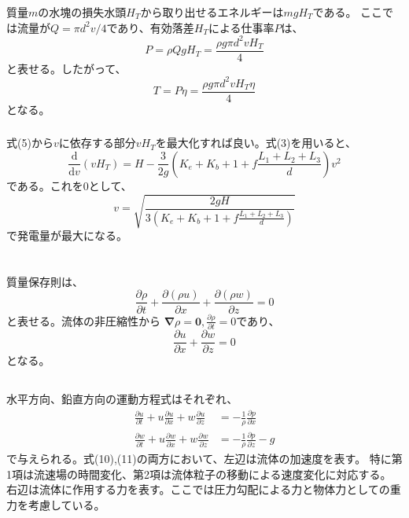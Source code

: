 \documentclass[a4paper]{jsarticle}
\begin{document}
\subsubsection{}
質量$m$の水塊の損失水頭$H_T$から取り出せるエネルギーは$mgH_T$である。
ここでは流量が$Q = \pi d^2 v / 4$であり、有効落差$H_T$による仕事率$P$は、
\begin{equation}
  P = \rho Q g H_T = \frac{\rho g \pi d^2 v H_T}{4}
\end{equation}
と表せる。したがって、
\begin{equation}
  T = P \eta = \frac{\rho g \pi d^2 v H_T \eta}{4}
\end{equation}
となる。

\subsubsection{}
式(5)から$v$に依存する部分$v H_T$を最大化すれば良い。式(3)を用いると、
\begin{equation}
  \frac{\mathrm{d}}{\mathrm{d} v}(v H_T)
  = H - \frac{3}{2g} \left(K_e + K_b + 1 + f \frac{L_1 + L_2 + L_3}{d}\right) v^2
\end{equation}
である。これを0として、
\begin{equation}
  v = \sqrt{\frac{2 g H}{3 (K_e + K_b + 1 + f \frac{L_1 + L_2 + L_3}{d})}}
\end{equation}
で発電量が最大になる。

\section{}
\subsection{}
質量保存則は、
\begin{equation}
  \frac{\partial \rho}{\partial t}
  + \frac{\partial (\rho u)}{\partial x} 
  + \frac{\partial (\rho w)}{\partial z} = 0
\end{equation}
と表せる。流体の非圧縮性から
$\boldsymbol{\nabla} \rho = \boldsymbol{0},\frac{\partial \rho}{\partial t} = 0$であり、
\begin{equation}
  \frac{\partial u}{\partial x} 
  + \frac{\partial w}{\partial z} = 0
\end{equation}
となる。

\subsection{}
水平方向、鉛直方向の運動方程式はそれぞれ、
\begin{align}
  \frac{\partial u}{\partial t} + u \frac{\partial u}{\partial x} + w \frac{\partial u}{\partial z} &= -\frac{1}{\rho} \frac{\partial p}{\partial x} \\
  \frac{\partial w}{\partial t} + u \frac{\partial w}{\partial x} + w \frac{\partial w}{\partial z} &= -\frac{1}{\rho} \frac{\partial p}{\partial z} -g
\end{align}
で与えられる。式(10),(11)の両方において、左辺は流体の加速度を表す。
特に第1項は流速場の時間変化、第2項は流体粒子の移動による速度変化に対応する。
右辺は流体に作用する力を表す。ここでは圧力勾配による力と物体力としての重力を考慮している。
\end{document}
